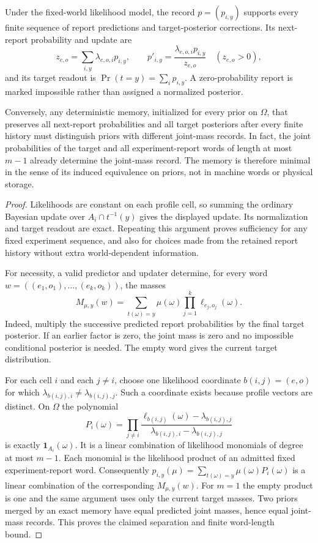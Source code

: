 \begin{GAtheorem}\label{GA:thm:likelihoodmemory}
Under the fixed-world likelihood model, the record $p=(p_{i,y})$ supports every finite sequence of report predictions and target-posterior corrections. Its next-report probability and update are
\[
z_{e,o}=\sum_{i,y}\lambda_{e,o,i}p_{i,y},\qquad
p'_{i,y}=\frac{\lambda_{e,o,i}p_{i,y}}{z_{e,o}}\quad(z_{e,o}>0),
\]
and its target readout is $\Pr(t=y)=\sum_i p_{i,y}$. A zero-probability report is marked impossible rather than assigned a normalized posterior.

Conversely, any deterministic memory, initialized for every prior on $\Omega$, that preserves all next-report probabilities and all target posteriors after every finite history must distinguish priors with different joint-mass records. In fact, the joint probabilities of the target and all experiment-report words of length at most $m-1$ already determine the joint-mass record. The memory is therefore minimal in the sense of its induced equivalence on priors, not in machine words or physical storage.
\end{GAtheorem}
\begin{proof}
Likelihoods are constant on each profile cell, so summing the ordinary Bayesian update over $A_i\cap t^{-1}(y)$ gives the displayed update. Its normalization and target readout are exact. Repeating this argument proves sufficiency for any fixed experiment sequence, and also for choices made from the retained report history without extra world-dependent information.

For necessity, a valid predictor and updater determine, for every word $w=((e_1,o_1),\ldots,(e_k,o_k))$, the masses
\[
M_{\mu,y}(w)=\sum_{t(\omega)=y}\mu(\omega)
                  \prod_{j=1}^k\ell_{e_j,o_j}(\omega).
\]
Indeed, multiply the successive predicted report probabilities by the final target posterior. If an earlier factor is zero, the joint mass is zero and no impossible conditional posterior is needed. The empty word gives the current target distribution.

For each cell $i$ and each $j\ne i$, choose one likelihood coordinate $b(i,j)=(e,o)$ for which $\lambda_{b(i,j),i}\ne\lambda_{b(i,j),j}$. Such a coordinate exists because profile vectors are distinct. On $\Omega$ the polynomial
\[
P_i(\omega)=\prod_{j\ne i}
\frac{\ell_{b(i,j)}(\omega)-\lambda_{b(i,j),j}}
     {\lambda_{b(i,j),i}-\lambda_{b(i,j),j}}
\]
is exactly $\mathbf1_{A_i}(\omega)$. It is a linear combination of likelihood monomials of degree at most $m-1$. Each monomial is the likelihood product of an admitted fixed experiment-report word. Consequently $p_{i,y}(\mu)=\sum_{t(\omega)=y}\mu(\omega)P_i(\omega)$ is a linear combination of the corresponding $M_{\mu,y}(w)$. For $m=1$ the empty product is one and the same argument uses only the current target masses. Two priors merged by an exact memory have equal predicted joint masses, hence equal joint-mass records. This proves the claimed separation and finite word-length bound.
\end{proof}


